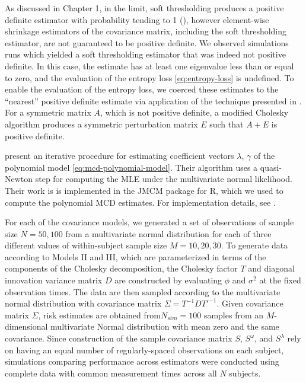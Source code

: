 \bigskip

As discussed in Chapter 1, in the limit, soft thresholding produces a positive definite estimator with probability tending to 1 (\cite{rothman2009generalized}), however element-wise shrinkage estimators of the covariance matrix, including the soft thresholding estimator, are not guaranteed to be positive definite. We observed simulations runs which yielded a soft thresholding estimator that was indeed not positive definite.  In this case, the estimate has at least one eigenvalue less than or equal to zero, and the evaluation of the entropy loss \ref{eq:entropy-loss} is undefined. To enable the evaluation of the entropy loss, we coerced these estimates to the ``nearest'' positive definite estimate via application of the technique presented in \cite{cheng1998modified}.  For a symmetric matrix $A$, which is not positive definite,  a modified Cholesky algorithm produces a symmetric perturbation matrix $E$ such that $A + E$ is positive definite.

\bigskip

\cite{pan2003modelling} present an iterative procedure for estimating coefficient vectors $\lambda$, $\gamma$ of the polynomial model \ref{eq:mcd-polynomial-model}. Their algorithm uses a quasi-Newton step for computing the MLE under the multivariate normal likelihood. Their work is  is implemented in the JMCM package for \textsf{R}, which we used to compute the polynomial MCD estimates.  For implementation details, see \cite{pan2017jmcm}. 	 


%

For each of the covariance models, we generated a set of observations of sample size $N = 50, 100$ from a multivariate normal distribution for each of three different values of within-subject sample size $M = 10, 20, 30$. To generate data according to Models II and III, which are parameterized in terms of the components of the Cholesky decomposition, the Cholesky factor $T$ and diagonal innovation variance matrix $D$ are constructed by evaluating $\phi$ and $\sigma^2$ at the fixed observation times. The data are then sampled according to the multivariate normal distribution with covariance matrix $\Sigma = T^{-1} D {T'}^{-1}$. Given covariance matrix $\Sigma$, risk estimates are obtained from$N_{sim} = 100$ samples from an $M$-dimensional multivariate Normal distribution with mean zero and the same covariance.  Since construction of the sample covariance matrix $S$, $S^\omega$, and $S^\lambda$ rely on having an equal number of regularly-spaced observations on each subject, simulations comparing performance across estimators were conducted using complete data with common measurement times across all $N$ subjects. 

